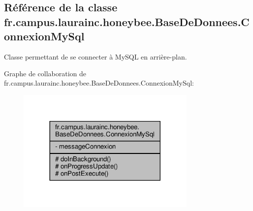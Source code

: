 \hypertarget{classfr_1_1campus_1_1laurainc_1_1honeybee_1_1_base_de_donnees_1_1_connexion_my_sql}{}\subsection{Référence de la classe fr.\+campus.\+laurainc.\+honeybee.\+Base\+De\+Donnees.\+Connexion\+My\+Sql}
\label{classfr_1_1campus_1_1laurainc_1_1honeybee_1_1_base_de_donnees_1_1_connexion_my_sql}


Classe permettant de se connecter à My\+S\+QL en arrière-\/plan.  




Graphe de collaboration de fr.\+campus.\+laurainc.\+honeybee.\+Base\+De\+Donnees.\+Connexion\+My\+Sql\+:\nopagebreak
\begin{figure}[H]
\begin{center}
\leavevmode
\includegraphics[width=248pt]{classfr_1_1campus_1_1laurainc_1_1honeybee_1_1_base_de_donnees_1_1_connexion_my_sql__coll__graph}
\end{center}
\end{figure}
